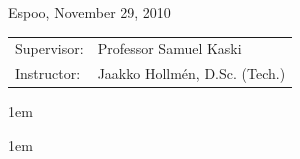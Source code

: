 \documentclass[a4paper,12pt,oneside]{book}
\renewcommand{\arraystretch}{1.1}	%
\begin{document}
	\begin{flushleft}
	Espoo, November 29, 2010
	\end{flushleft}
	\vspace{0.5cm}
	
	\begin{flushleft}
	\begin{tabular}{@{}ll}
	Supervisor: \hspace{1.0cm} & Professor Samuel Kaski \\
	Instructor: & Jaakko Hollmén, D.Sc. (Tech.) 
	\end{tabular}
	\end{flushleft}

\clearpage

\thispagestyle{empty}


\clearpage

\renewcommand{\arraystretch}{1.1}	%
\parindent 1em 				%
\parskip 0pt 				%

\onehalfspacing
\pagestyle{plain}


\clearpage

\parindent 1em 				%



\tableofcontents
{}

\clearpage

\onehalfspacing
{}


\clearpage

\listoffigures
{}
\clearpage

\listoftables
{}
\label{lastoffront}
\clearpage

\mainmatter 			%
\pagestyle{fancy} 		%

\end{document}

